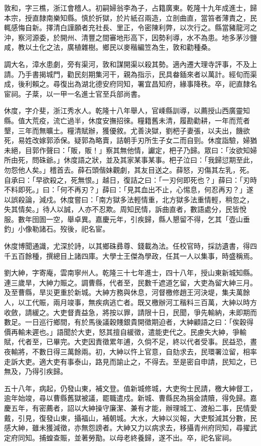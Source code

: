 \begin{pinyinscope}
敦和，字三樵，浙江會稽人。初嗣婦翁李為子，占籍廣東。乾隆十九年成進士，歸本宗，授直隸南樂知縣。慎於折獄，於片紙召兩造，立剖曲直，當笞者薄責之，民輒感悔自新。擇清白謹願者充社長、里正，令密陳利弊，以次行之。縣當豬龍河之沖，察河源委，於開州、清豐之間審地形高下，因勢利導，水不為患。地多茅沙鹽咸，教以土化之法，廣植雜樹。鄉民以麥稭編笠為生，敦和勸種桑。

調大名，漳水患劇，旁有渠河，敦和謀開渠以殺其勢。適內遷大理寺評事，不及上請。乃手書揭城門，勸民刻期集河干，親為指示，民具畚鍤來者以萬計。經旬而渠成，後利賴之。尋復出為湖北德安府同知，署宜昌知府，緣事降秩。卒，祀直隸名宦祠。子棻，以一甲一名進士官至兵部尚書。

休度，字介斐，浙江秀水人。乾隆十八年舉人，官嵊縣訓導，以薦授山西廣靈知縣。值大荒疫，流亡過半，休度安撫招徠。糧籍舊未清，履勘勸耕，一年而荒者墾，三年而無曠土。糧清賦辦，獲優敘。尤善決獄，劉杷子妻張，以夫出，饑欲死，易姓改嫁郭添保。疑郭為略賣，詰朝手刃所生子女二而自剄。休度詣驗，婦猶未絕，目郭作聲曰：「販，販！」察其無他情，讞定，杷子乃歸。眾曰：「汝欲知婦所由死，問硃爺。」休度語之狀，並及其家某事某事。杷子泣曰：「我歸愆期至此，勿怨他人矣。」稽首去。薛石頭偕妹觀劇，其友目送之。薛怒，刃傷其左乳，死。自承曰：「早欲殺之，死無恨。」越日，復詰之曰：「一刃何即死也？」薛曰：「刃時不料即死。」曰：「何不再刃？」薛曰：「見其血出不止，心惕息，何忍再刃？」遂以誤殺論，減戍。休度嘗曰：「南方獄多法輕情重，北方獄多法重情輕，稍忽之，失其情矣。」待人以誠，人亦不忍欺。周知民情，訴曲直者，數語處分，民皆悅服。數年囹圄一空，舉卓異。嘉慶元年，引疾歸，縣人懇留不得，乞其「壺山垂釣」小像勒諸石。歿後，祀名宦。

休度博聞通識，尤深於詩，以其鄉硃彞尊、錢載為法。任校官時，採訪遺書，得四千五百餘種，撰總目上諸四庫。大學士王傑為學政，任其一人以集事，時盛稱焉。

劉大紳，字寄庵，雲南寧州人。乾隆三十七年進士，四十八年，授山東新城知縣。連三歲旱，大紳力賑之。調曹縣，代者至，民數千遮道乞留，大吏為留大紳三月。及至曹縣，旱災更重於新城。大紳方務與休息，河督檄修趙王河決堤，集夫萬餘人，以工代賑，兩月竣事，無疾病逃亡者。既又檄辦河工稭料三百萬，大紳以時方收斂，請緩之。大吏督責益急，將按以罪，請限十日，民聞，爭先輸納，未即期而數足。一日巡行鄉間，有於馬後議穀賤銀貴開徵期迫者，大紳顧語之曰：「俟穀得價再輸未遲也。」語聞於大吏，怒其擅自緩徵，遣能吏代之。民慮失大紳，爭輸賦，代者至，已畢完。大吏因責徵累年逋，久倘不足，終以代者受事。民益恐，晝夜輸將，不數日得三萬餘兩。初，大紳以忤上官意，自劾求去，民環署泣留，相率走訴大吏。適大吏有事泰山，路見而諭止之，不得去。至是密自申請，民知之，已無及，乃得引疾歸。

五十八年，病起，仍發山東，補文登。值新城修城，大吏徇士民請，檄大紳督工，逾年始竣，尋以曹縣舊獄被議，罷職遣戍。新城、曹縣民為捐金請贖，得免歸。嘉慶五年，有密薦者，詔以大紳操守廉潔、兼有才能，辦理城工、渡船二事，民情愛戴，引見，復發山東，攝福山，補朝城。大水，大紳以災報，大吏駁減其分數，民感大紳，雖未獲減徵，亦無怨謗者。大紳又力以病求去，移攝青州府同知，尋擢武定府同知。捕蝗查賑，並著勞勩。以母老終養歸，遂不出。卒，祀名宦祠。


\end{pinyinscope}
